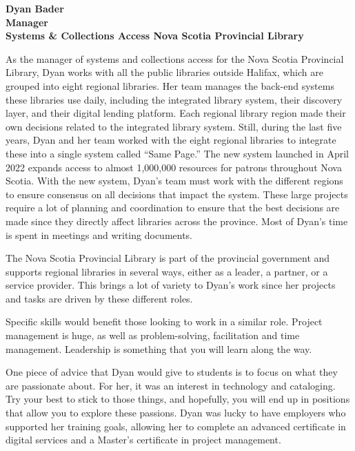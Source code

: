 \documentclass[
  letterpaper,
  DIV=11,
  numbers=noendperiod]{scrreprt}
\begin{document}
\begin{tcolorbox}[enhanced jigsaw, arc=.35mm, bottomrule=.15mm, bottomtitle=1mm, breakable, colback=white, colbacktitle=quarto-callout-tip-color!10!white, colframe=quarto-callout-tip-color-frame, coltitle=black, left=2mm, leftrule=.75mm, opacityback=0, opacitybacktitle=0.6, rightrule=.15mm, title=\textcolor{quarto-callout-tip-color}{\faLightbulb}\hspace{0.5em}{Meet a professionals}, titlerule=0mm, toprule=.15mm, toptitle=1mm]

\textbf{Dyan Bader\\
Manager\\
Systems \& Collections Access Nova Scotia Provincial Library}

As the manager of systems and collections access for the Nova Scotia
Provincial Library, Dyan works with all the public libraries outside
Halifax, which are grouped into eight regional libraries. Her team
manages the back-end systems these libraries use daily, including the
integrated library system, their discovery layer, and their digital
lending platform. Each regional library region made their own decisions
related to the integrated library system. Still, during the last five
years, Dyan and her team worked with the eight regional libraries to
integrate these into a single system called ``Same Page.'' The new
system launched in April 2022 expands access to almost 1,000,000
resources for patrons throughout Nova Scotia. With the new system,
Dyan's team must work with the different regions to ensure consensus on
all decisions that impact the system. These large projects require a lot
of planning and coordination to ensure that the best decisions are made
since they directly affect libraries across the province. Most of Dyan's
time is spent in meetings and writing documents.

The Nova Scotia Provincial Library is part of the provincial government
and supports regional libraries in several ways, either as a leader, a
partner, or a service provider. This brings a lot of variety to Dyan's
work since her projects and tasks are driven by these different roles.

Specific skills would benefit those looking to work in a similar role.
Project management is huge, as well as problem-solving, facilitation and
time management. Leadership is something that you will learn along the
way.

One piece of advice that Dyan would give to students is to focus on what
they are passionate about. For her, it was an interest in technology and
cataloging. Try your best to stick to those things, and hopefully, you
will end up in positions that allow you to explore these passions. Dyan
was lucky to have employers who supported her training goals, allowing
her to complete an advanced certificate in digital services and a
Master's certificate in project management.


\end{tcolorbox}
\end{document}
